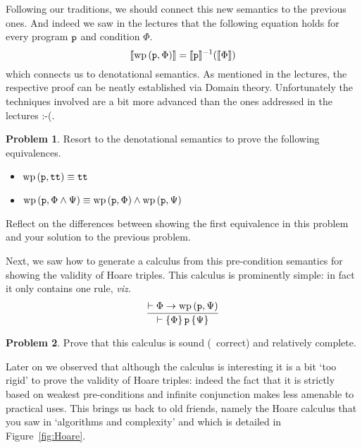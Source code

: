 \documentclass[a4paper, 11pt]{article}
\theoremstyle{definition}
\newtheorem{problem}{Problem}
\begin{document}
Following our traditions, we should connect this new semantics to the previous
ones. And indeed we saw in the lectures that the following equation holds for
every program $\mathtt{p}$ and condition $\Phi$.
\[
        \llbracket \mathrm{wp} \, (\mathtt{p}, \Phi) \rrbracket = \llbracket \mathtt{p} \rrbracket^{-1}(\llbracket \Phi \rrbracket)
\]
which connects us to denotational semantics.  As mentioned in the lectures, the
respective proof can be neatly established via Domain theory. Unfortunately
the techniques involved are a bit more advanced than the ones addressed in the
lectures :-(.

\begin{problem}
    Resort to the denotational semantics to prove the following equivalences.
    \begin{itemize}
                \item $\mathrm{wp} \, (\mathtt{p}, \mathtt{tt}) \equiv \mathtt{tt}$
                \item $\mathrm{wp} \, (\mathtt{p}, \Phi \wedge \Psi )
                \equiv \mathrm{wp} \, (\mathtt{p}, \Phi) \wedge 
                \mathrm{wp} \, (\mathtt{p}, \Psi )$
   \end{itemize}
   Reflect on the differences between showing the first equivalence in this problem and your
   solution to the previous problem.
\end{problem}

Next, we saw how to generate a calculus from this pre-condition semantics for
showing the validity of Hoare triples. This calculus is prominently simple: in
fact it only contains one rule, \emph{viz.}
\[
                \infer{\vdash \{ \Phi \} \, \prog{p} \, \{ \Psi \}}
                { \vdash \Phi \rightarrow \mathrm{wp} \, (\prog{p}, \Psi) }
\]

\begin{problem}
        Prove that this calculus is sound (\ie\ correct) and relatively complete.
\end{problem}

Later on we observed that although the calculus is interesting it is a bit `too
rigid' to prove the validity of Hoare triples: indeed the fact that it is
strictly based on weakest pre-conditions and infinite conjunction makes less
amenable to practical uses. This brings us back to old friends, namely the
Hoare calculus that you saw in `algorithms and complexity' and which is detailed
in Figure~\ref{fig:Hoare}.
\end{document}
